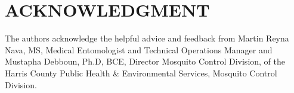 \documentclass[letterpaper, 10 pt, conference]{ieeeconf}  %
\begin{document}








%

\section*{ACKNOWLEDGMENT}
The authors acknowledge the helpful advice and feedback from Martin Reyna Nava, MS, Medical Entomologist and Technical Operations Manager and Mustapha Debboun, Ph.D, BCE, Director Mosquito Control Division, of the Harris County Public Health \& Environmental Services, Mosquito Control Division.







%

%
%
%
%
%
%
\end{document}
